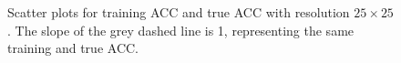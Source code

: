 \documentclass[12pt]{article}
\begin{document}
        \begin{figure}[htpb]
            \centering
            \caption{Scatter plots for training ACC and true ACC with resolution $25\times 25$. The slope of the grey dashed line is 1, representing the same training and true ACC.}
            \label{fig:acc_scatter_resolution_25}
        \end{figure}
\end{document}
